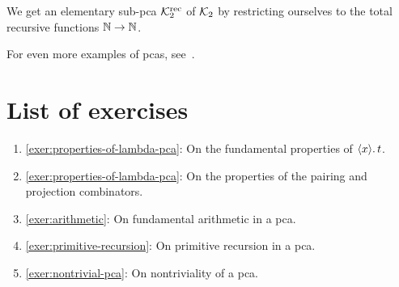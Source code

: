\begin{example}\label{Kleene-rec-2}
  We get an elementary sub-pca \(\mathcal{K}_2^\textup{rec}\) of \(\mathcal{K}_2\) by restricting
  ourselves to the total recursive %
  functions
  \(\mathbb N \to \mathbb N\).
\end{example}

For even more examples of pcas,
see~\cite[Section~1.4]{vanOosten2008}.

\section{List of exercises}
\begin{enumerate}
\item \cref{exer:properties-of-lambda-pca}: On the fundamental properties of
  \(\langle{{x}}\rangle.\,{t}\).
\item \cref{exer:properties-of-lambda-pca}: On the properties of the pairing and
  projection combinators.
\item \cref{exer:arithmetic}: On fundamental arithmetic in a pca.
\item \cref{exer:primitive-recursion}: On primitive recursion in a pca.
\item \cref{exer:nontrivial-pca}: On nontriviality of a pca.
\end{enumerate}




